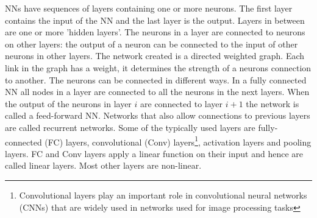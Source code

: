 \documentclass[../thesis.tex]{subfiles}
\begin{document}


NNs have sequences of layers containing one or more neurons. The first layer contains the input of the NN and the last layer is the output. Layers in between are one or more 'hidden layers'. The neurons in a layer are connected to neurons on other layers: the output of a neuron can be connected to the input of other neurons in other layers. The network created is a directed weighted graph. Each link in the graph has a weight, it determines the strength of a neurons connection to another. The neurons can be connected in different ways. In a fully connected NN all nodes in a layer are connected to all the neurons in the next layers. When the output of the neurons in layer $i$ are connected to layer $i+1$ the network is called a feed-forward NN. Networks that also allow connections to previous layers are called recurrent networks. Some of the typically used layers are fully-connected (FC) layers, convolutional (Conv) layers\footnote{Convolutional layers play an important role in convolutional neural networks (CNNs) that are widely used in networks used for image processing tasks}, activation layers and pooling layers. FC and Conv layers apply a linear function on their input and hence are called linear layers. Most other layers are non-linear. 
\end{document}

